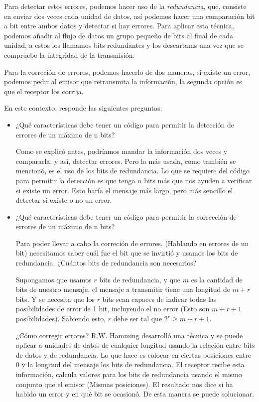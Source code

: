 \documentclass[spanish,12pt,letterpaper]{article}
\begin{document}
Para detectar estos errores, podemos hacer uso de la \textit{redundancia}, que,
consiste en enviar dos veces cada unidad de datos, así podemos hacer una
comparación bit a bit entre ambos datos y detectar si hay errores. Para aplicar
esta técnica, podemos añadir al flujo de datos un grupo pequeño de bits al final
de cada unidad, a estos los llamamos bits redundantes y los descartams una vez
que se compruebe la integridad de la transmisión.

Para la correción de errores, podemos hacerlo de dos maneras, si existe un error,
podemos pedir al emisor que retransmita la información, la segunda opción es que
el receptor los corrija.

En este contexto, responde las siguientes preguntas:
\begin{itemize}
\item ¿Qué características debe tener un código para permitir la detección de
  errores de un máximo de n bits?

  Como se explicó antes, podríamos mandar la información dos veces y compararla,
  y así, detectar errores. Pero la más usada, como también se mencionó, es el uso
  de los bits de redundancia. Lo que se requiere del código para permitir la
  detección es que tenga $n$ bits más que nos ayuden a verificar si existe un
  error. Esto haría el mensaje más largo, pero más sencillo el detectar si existe
  o no un error.
  
\item ¿Qué características debe tener un código para permitir la corrección de
  errores de un máximo de n bits?

  Para poder llevar a cabo la correción de errores, (Hablando en errores de un
  bit) necesitamos saber cuál fue el bit que se invirtió y usamos los bits de
  redundancia. ¿Cuántos bits de redundancia son necesarios?

  Supongamos que usamos $r$ bits de redundancia, y que $m$ es la cantidad de bits
  de nuestro mensaje, el mensaje a transmitir tiene una longitud de $m+r$ bits. Y
  se necesita que los $r$ bits sean capaces de indicar todas las posibilidades de
  error de 1 bit, incluyendo el no error (Esto son $m+r+1$ posibilidades).
  Sabiendo esto, $r$ debe ser tal que $2^{r} \geq m+r+1$.

  ¿Cómo corregir errores? R.W. Hamming desarrolló una técnica y se puede aplicar
  a unidades de datos de cualquier longitud usando la relación entre bits de
  datos y de redundancia. Lo que hace es colocar en ciertas posiciones entre $0$
  y la longitud del mensaje los bits de redundancia. El receptor recibe esta
  información, calcula valores para los bits de redundancia usando el mismo
  conjunto que el emisor (Mismas posiciones). El resultado nos dice si ha habido
  un error y en qué bit se ocasionó. De esta manera se puede solucionar.


\end{itemize}
\end{document}
